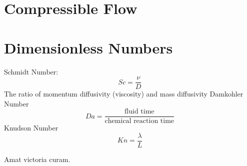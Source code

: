\documentclass{article}
\begin{document}
%
%
\newpage
\section{Compressible Flow}



%
%
\newpage
\section{Dimensionless Numbers}
Schmidt Number:
\begin{equation}
  Sc = \frac{\nu}{D}
\end{equation}
The ratio of momentum diffusivity (viscosity) and mass diffusivity
\newline
\newline
Damkohler Number
\begin{equation}
  Da = \frac{\textrm{fluid time}}{\textrm{chemical reaction time}}
\end{equation}
\newline
\newline
Knudson Number
\begin{equation}
  Kn = \frac{\lambda}{L}
\end{equation}

\newpage
Amat victoria curam. 
\end{document}
